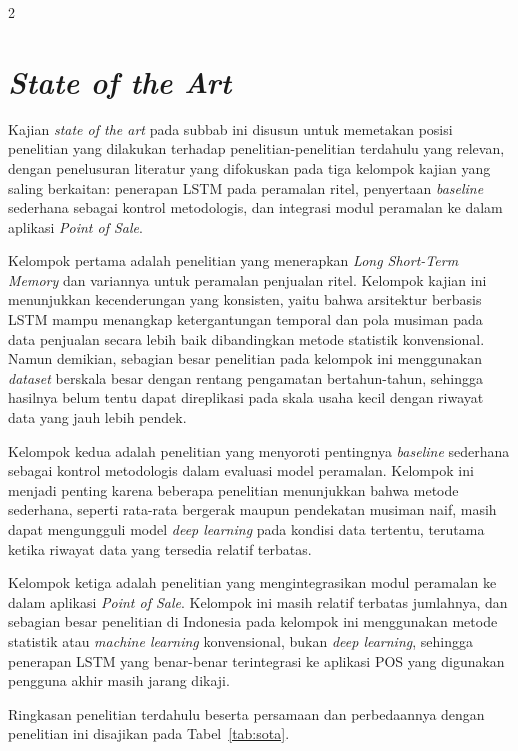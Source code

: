 \documentclass[12pt, a4paper, onecolumn, oneside]{report}
\begin{document}
\begin{spacing}{2}
\section{\textit{State of the Art}}

Kajian \textit{state of the art} pada subbab ini disusun untuk memetakan posisi penelitian yang dilakukan terhadap penelitian-penelitian terdahulu yang relevan, dengan penelusuran literatur yang difokuskan pada tiga kelompok kajian yang saling berkaitan: penerapan LSTM pada peramalan ritel, penyertaan \textit{baseline} sederhana sebagai kontrol metodologis, dan integrasi modul peramalan ke dalam aplikasi \textit{Point of Sale}.

Kelompok pertama adalah penelitian yang menerapkan \textit{Long Short-Term Memory} dan variannya untuk peramalan penjualan ritel. Kelompok kajian ini menunjukkan kecenderungan yang konsisten, yaitu bahwa arsitektur berbasis LSTM mampu menangkap ketergantungan temporal dan pola musiman pada data penjualan secara lebih baik dibandingkan metode statistik konvensional. Namun demikian, sebagian besar penelitian pada kelompok ini menggunakan \textit{dataset} berskala besar dengan rentang pengamatan bertahun-tahun, sehingga hasilnya belum tentu dapat direplikasi pada skala usaha kecil dengan riwayat data yang jauh lebih pendek.

Kelompok kedua adalah penelitian yang menyoroti pentingnya \textit{baseline} sederhana sebagai kontrol metodologis dalam evaluasi model peramalan. Kelompok ini menjadi penting karena beberapa penelitian menunjukkan bahwa metode sederhana, seperti rata-rata bergerak maupun pendekatan musiman naif, masih dapat mengungguli model \textit{deep learning} pada kondisi data tertentu, terutama ketika riwayat data yang tersedia relatif terbatas.

Kelompok ketiga adalah penelitian yang mengintegrasikan modul peramalan ke dalam aplikasi \textit{Point of Sale}. Kelompok ini masih relatif terbatas jumlahnya, dan sebagian besar penelitian di Indonesia pada kelompok ini menggunakan metode statistik atau \textit{machine learning} konvensional, bukan \textit{deep learning}, sehingga penerapan LSTM yang benar-benar terintegrasi ke aplikasi POS yang digunakan pengguna akhir masih jarang dikaji.

Ringkasan penelitian terdahulu beserta persamaan dan perbedaannya dengan penelitian ini disajikan pada Tabel~\ref{tab:sota}.

\begin{landscape}
\setlength{\tabcolsep}{3pt}
{\small{}
\begin{longtable}{|>{\centering\arraybackslash}p{0.7cm}|>{\raggedright\arraybackslash}p{2.9cm}|>{\raggedright\arraybackslash}p{3.7cm}|>{\raggedright\arraybackslash}p{3.1cm}|>{\raggedright\arraybackslash}p{3.4cm}|>{\raggedright\arraybackslash}p{3.2cm}|>{\raggedright\arraybackslash}p{3.5cm}|}


\end{longtable}}
\end{landscape}
\end{spacing}
\end{document}

